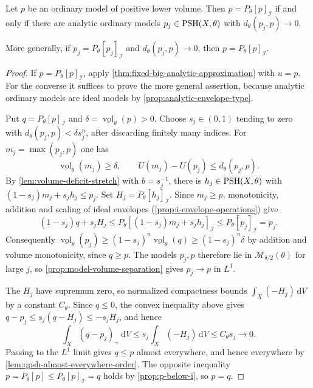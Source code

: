 \begin{theorem}\label{thm:analytic-model-volume-criterion}
Let $p$ be an ordinary model of positive lower volume. Then $p=P_\theta[p]_{\mathcal I}$ if and only if there are analytic ordinary models $p_j\in\mathrm{PSH}(X,\theta)$ with $d_\theta(p_j,p)\to0$.

More generally, if $p_j=P_\theta[p_j]_{\mathcal I}$ and $d_\theta(p_j,p)\to0$, then $p=P_\theta[p]_{\mathcal I}$.
\end{theorem}
\begin{proof}
If $p=P_\theta[p]_{\mathcal I}$, apply \cref{thm:fixed-big-analytic-approximation} with $u=p$. For the converse it suffices to prove the more general assertion, because analytic ordinary models are ideal models by \cref{prop:analytic-envelope-type}.

Put $q=P_\theta[p]_{\mathcal I}$ and $\delta=\underline{\operatorname{vol}}_\theta(p)>0$. Choose $s_j\in(0,1)$ tending to zero with $d_\theta(p_j,p)<\delta s_j^n$, after discarding finitely many indices. For $m_j=\max(p_j,p)$ one has
\[
 \underline{\operatorname{vol}}_\theta(m_j)\geq\delta,
 \qquad U(m_j)-U(p_j)\leq d_\theta(p_j,p).
\]
By \cref{lem:volume-deficit-stretch} with $b=s_j^{-1}$, there is $h_j\in\mathrm{PSH}(X,\theta)$ with $(1-s_j)m_j+s_jh_j\leq p_j$. Set $H_j=P_\theta[h_j]_{\mathcal I}$. Since $m_j\geq p$, monotonicity, addition and scaling of ideal envelopes (\cref{prop:i-envelope-operations}) give
\[
 (1-s_j)q+s_jH_j
 \leq P_\theta[(1-s_j)m_j+s_jh_j]_{\mathcal I}
 \leq P_\theta[p_j]_{\mathcal I}=p_j.
\]
Consequently $\underline{\operatorname{vol}}_\theta(p_j)\geq(1-s_j)^n\underline{\operatorname{vol}}_\theta(q)\geq(1-s_j)^n\delta$ by addition and volume monotonicity, since $q\geq p$. The models $p_j,p$ therefore lie in $\mathcal M_{\delta/2}(\theta)$ for large $j$, so \cref{prop:model-volume-separation} gives $p_j\to p$ in $L^1$.

The $H_j$ have supremum zero, so normalized compactness bounds $\int_X(-H_j)\,\mathrm{d}V$ by a constant $C_\theta$. Since $q\leq0$, the convex inequality above gives $q-p_j\leq s_j(q-H_j)\leq-s_jH_j$, and hence
\[
 \int_X(q-p_j)_+\,\mathrm{d}V
       \leq s_j\int_X(-H_j)\,\mathrm{d}V
       \leq C_\theta s_j\longrightarrow0.
\]
Passing to the $L^1$ limit gives $q\leq p$ almost everywhere, and hence everywhere by \cref{lem:qpsh-almost-everywhere-order}. The opposite inequality $p=P_\theta[p]\leq P_\theta[p]_{\mathcal I}=q$ holds by \cref{prop:p-below-i}, so $p=q$.
\end{proof}

